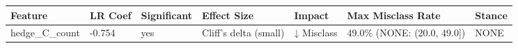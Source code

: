 \begin{tabular}{lllllll}
\toprule
Feature & LR Coef & Significant & Effect Size & Impact & Max Misclass Rate & Stance \\
\midrule
hedge\_C\_count & -0.754 & yes & Cliff's delta (small) & ↓ Misclass & 49.0\% (NONE: (20.0, 49.0]) & NONE \\
\bottomrule
\end{tabular}
